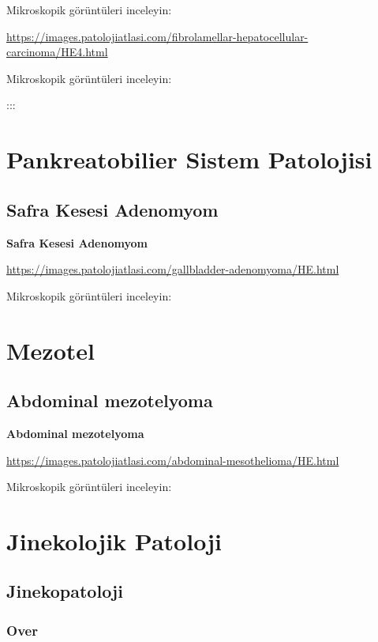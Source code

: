 \documentclass[
  letterpaper,
  DIV=11,
  numbers=noendperiod]{scrreprt}
\begin{document}
Mikroskopik görüntüleri inceleyin:

\url{https://images.patolojiatlasi.com/fibrolamellar-hepatocellular-carcinoma/HE4.html}

Mikroskopik görüntüleri inceleyin:

:::

\part{Pankreatobilier Sistem Patolojisi}

\hypertarget{safra-kesesi-adenomyom}{%
\chapter{Safra Kesesi Adenomyom}\label{safra-kesesi-adenomyom}}

\textbf{Safra Kesesi Adenomyom}

\url{https://images.patolojiatlasi.com/gallbladder-adenomyoma/HE.html}

Mikroskopik görüntüleri inceleyin:

\part{Mezotel}

\hypertarget{abdominal-mezotelyoma}{%
\chapter{Abdominal mezotelyoma}\label{abdominal-mezotelyoma}}

\textbf{Abdominal mezotelyoma}

\url{https://images.patolojiatlasi.com/abdominal-mesothelioma/HE.html}

Mikroskopik görüntüleri inceleyin:

\part{Jinekolojik Patoloji}

\hypertarget{jinekopatoloji}{%
\chapter{Jinekopatoloji}\label{jinekopatoloji}}

\hypertarget{over}{%
\section{Over}\label{over}}
\end{document}
